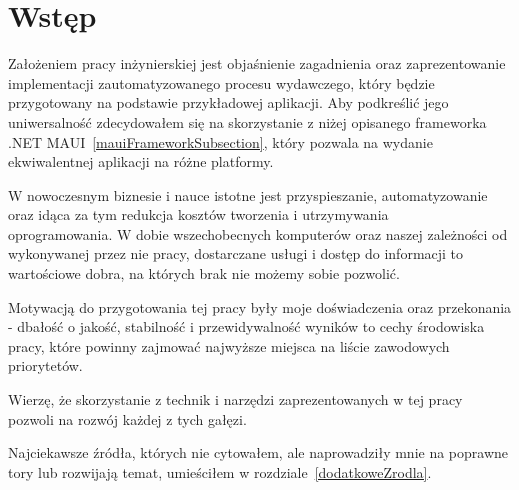 \section{Wstęp}

Założeniem pracy inżynierskiej jest objaśnienie zagadnienia oraz zaprezentowanie 
implementacji zautomatyzowanego procesu wydawczego, który będzie 
przygotowany na podstawie przykładowej aplikacji. 
Aby podkreślić jego uniwersalność zdecydowałem się na skorzystanie z niżej opisanego frameworka 
.NET MAUI~\ref{mauiFrameworkSubsection}, który pozwala na wydanie ekwiwalentnej aplikacji na różne platformy.

W nowoczesnym biznesie i nauce istotne jest przyspieszanie, automatyzowanie 
oraz idąca za tym redukcja kosztów tworzenia i utrzymywania \\oprogramowania.
W dobie wszechobecnych komputerów oraz naszej zależności od wykonywanej przez 
nie pracy, dostarczane usługi i dostęp do informacji to wartościowe dobra, 
na których brak nie możemy sobie pozwolić.

Motywacją do przygotowania tej pracy były moje doświadczenia oraz przekonania - 
dbałość o jakość, stabilność i przewidywalność wyników to cechy środowiska pracy, 
które powinny zajmować najwyższe miejsca na liście zawodowych priorytetów.

Wierzę, że skorzystanie z technik i narzędzi zaprezentowanych w tej pracy 
pozwoli na rozwój każdej z tych gałęzi.

Najciekawsze źródła, których nie cytowałem, ale naprowadziły mnie na poprawne tory lub rozwijają temat, 
umieściłem w rozdziale~\ref{dodatkoweZrodla}.

